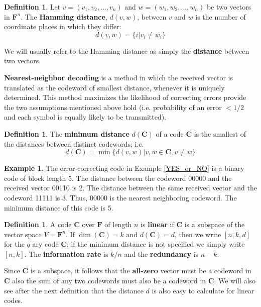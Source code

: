 \documentclass[conference]{IEEEtran}
\theoremstyle{definition}
\newtheorem{definition}[thm]{Definition}
\newtheorem{example}[thm]{Example}
\begin{document}
\begin{definition}
Let $v=(v_1,v_2,\ldots,v_n)$ and $w=(w_1,w_2,\ldots,w_n)$ be
two vectors in $\mathbf{F}^n$.  The {\bf Hamming distance},
$d(v,w)$, between $v$ and $w$ is the number of coordinate
places in which they differ:
$$
d(v,w)=\{i|v_i\neq w_i \}
$$

We will usually refer to the Hamming distance as simply the
{\bf distance} between two vectors.
\end{definition}

{\bf Nearest-neighbor decoding} is a method in which the
received vector is translated as the codeword of smallest
distance, whenever it is uniquely determined.  This method
maximizes the likelihood of correcting errors provide the
two assumptions mentioned above hold (i.e. probability of
an error $<1/2$ and each symbol is equally likely to be
transmitted).

\begin{definition}
The {\bf minimum distance} $d(\mathbf{C})$ of a code
$\mathbf{C}$ is the smallest of the distances between
distinct codewords; i.e.
$$
d(\mathbf{C}) = \min\{d(v,w)|v,w\in\mathbf{C},v\neq w\}
$$
\end{definition}


\begin{example}
The error-correcting code in Example \ref{YES_or_NO} is
a binary code of block length 5. The distance between
the codeword 00000 and the received vector 00110 is 2.
The distance between the same received vector and the
codeword 11111 is 3.  Thus, 00000 is the nearest neighboring
codeword.  The minimum distance of this code is 5.
\end{example}

\begin{definition}
A code $\mathbf{C}$ over $\mathbf{F}$ of length $n$ is
{\bf linear} if $\mathbf{C}$ is a subspace of the vector
space $V=\mathbf{F}^n$.  If $\dim(\mathbf{C})=k$ and
$d(\mathbf{C})=d$, then we write $[n,k,d]$ for the $q$-ary
code $\mathbf{C}$; if the minimum distance is not specified
we simply write $[n,k]$. The {\bf information rate} is $k/n$
and the {\bf redundancy} is $n-k$.  
\end{definition}

Since $\mathbf{C}$ is a subspace, it follows that the
{\bf all-zero} vector must be a codeword in $\mathbf{C}$
also the sum of any two codewords must also be a codeword
in $\mathbf{C}$.  We will also see after the next
definition that the distance $d$ is also easy to
calculate for linear codes.
\end{document}
